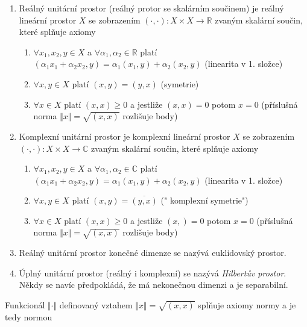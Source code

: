 \begin{definition} 


 \begin{enumerate}
	\item Reálný unitární prostor (reálný protor se skalárním součinem) je reálný lineární prostor $X$ se zobrazením $ (\cdot,\cdot): X \times X \rightarrow \mathbb{R}$ zvaným skalární součin, které splňuje axiomy \begin{enumerate}
	\item $\forall x_1,x_2,y \in X$ a $\forall \alpha_1,\alpha_2 \in \mathbb{R}$ platí $(\alpha_1x_1+\alpha_2 x_2,y)=\alpha_1 (x_1,y) + \alpha_2 (x_2,y)$ (linearita v 1. složce)
	\item $\forall x,y \in X$ platí $ (x,y) = (y,x)$ (symetrie)
	\item $\forall x \in X$ platí $(x,x)\geq 0$ a jestliže $(x,x) =0$ potom $x=0$ (příslušná norma $\Vert x \Vert = \sqrt{(x,x)}$ rozlišuje body)
 \end{enumerate} 
\item Komplexní unitární prostor je komplexní lineární prostor $X$ se zobrazením $ (\cdot,\cdot): X \times X \rightarrow \mathbb{C}$ zvaným skalární součin, které splňuje axiomy \begin{enumerate}
 	\item $\forall x_1,x_2,y \in X$ a $\forall \alpha_1,\alpha_2 \in \mathbb{C}$ platí $(\alpha_1x_1+\alpha_2 x_2,y)=\alpha_1 (x_1,y) + \alpha_2 (x_2,y)$ (linearita v 1. složce)
	\item $\forall x,y \in X$ platí $ (x,y) = \overline{(y,x)}$ (" komplexní symetrie")
	\item $\forall x \in X$ platí $(x,x)\geq 0$ a jestliže $(x,) =0$ potom $x=0$ (příslušná norma $\Vert x \Vert = \sqrt{(x,x)}$ rozlišuje body)
 \end{enumerate}
 \item Reálný unitární prostor konečné dimenze se nazývá euklidovský prostor.
 \item Úplný unitární prostor (reálný i komplexní) se nazývá \textit{Hilbertův prostor}. Někdy se navíc předpokládá, že má nekonečnou dimenzi a je separabilní.
\end{enumerate}

\end{definition}

\begin{notes}
	Funkcionál $\Vert \cdot \Vert$ definovaný vztahem $\Vert x \Vert= \sqrt{(x,x)}$ splňuje axiomy normy a je tedy normou
\end{notes}


